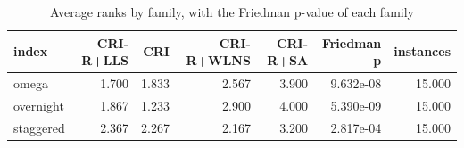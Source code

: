 \begin{table}[htbp]
\centering
\small
\caption{Average ranks by family, with the Friedman p-value of each family}
\label{tab:E5b_ablation_60s_b60_ranks_by_family}
\begin{tabular}{lrrrrrr}
\toprule
index & CRI-R+LLS & CRI & CRI-R+WLNS & CRI-R+SA & Friedman p & instances \\
\midrule
omega & 1.700 & 1.833 & 2.567 & 3.900 & 9.632e-08 & 15.000 \\
overnight & 1.867 & 1.233 & 2.900 & 4.000 & 5.390e-09 & 15.000 \\
staggered & 2.367 & 2.267 & 2.167 & 3.200 & 2.817e-04 & 15.000 \\
\bottomrule
\end{tabular}
\end{table}
